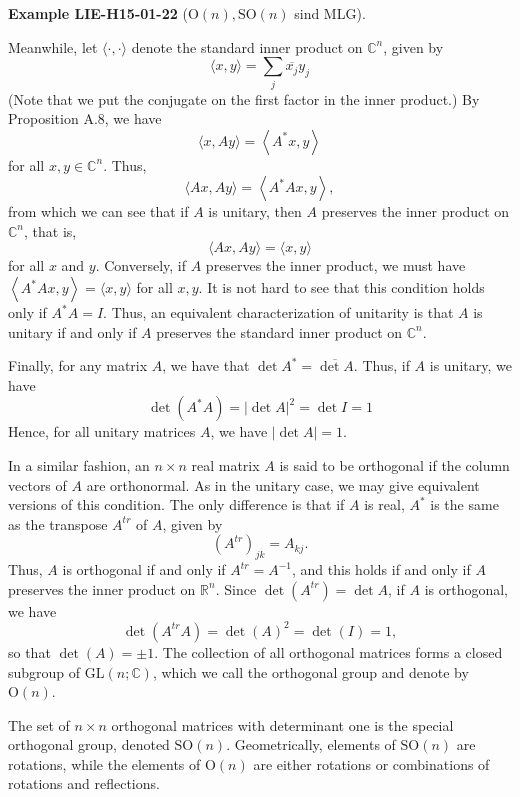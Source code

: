 \documentclass[10pt, letterpaper]{article}
\newcommand{\SO}{\mathrm{SO}}
\newcommand{\Ogroup}{\mathrm{O}} %
\newcommand{\CustomHeading}[3]{%
  \par\medskip\noindent%
  \textbf{#1 #2} \textnormal{(#3)}.\enskip%
}
\newenvironment{EXA}[2]{\CustomHeading{Example}{#1}{#2}}{}
\begin{document}
\begin{EXA}{LIE-H15-01-22}{$\Ogroup(n), \SO(n)$ sind MLG}
Meanwhile, let $\langle\cdot, \cdot\rangle$ denote the standard inner product on $\mathbb{C}^{n}$, given by
$$
\langle x, y\rangle=\sum_{j} \overline{x_{j}} y_{j}
$$
(Note that we put the conjugate on the first factor in the inner product.) By Proposition A.8, we have
$$
\langle x, A y\rangle=\left\langle A^{*} x, y\right\rangle
$$
for all $x, y \in \mathbb{C}^{n}$. Thus,
$$
\langle A x, A y\rangle=\left\langle A^{*} A x, y\right\rangle,
$$
from which we can see that if $A$ is unitary, then $A$ preserves the inner product on $\mathbb{C}^{n}$, that is,
$$
\langle A x, A y\rangle=\langle x, y\rangle
$$
for all $x$ and $y$. Conversely, if $A$ preserves the inner product, we must have $\left\langle A^{*} A x, y\right\rangle=\langle x, y\rangle$ for all $x, y$. It is not hard to see that this condition holds only if $A^{*} A=I$. Thus, an equivalent characterization of unitarity is that $A$ is unitary if and only if $A$ preserves the standard inner product on $\mathbb{C}^{n}$.

Finally, for any matrix $A$, we have that $\operatorname{det} A^{*}=\overline{\operatorname{det} A}$. Thus, if $A$ is unitary, we have
$$
\operatorname{det}\left(A^{*} A\right)=|\operatorname{det} A|^{2}=\operatorname{det} I=1
$$
Hence, for all unitary matrices $A$, we have $|\operatorname{det} A|=1$.

In a similar fashion, an $n \times n$ real matrix $A$ is said to be orthogonal if the column vectors of $A$ are orthonormal. As in the unitary case, we may give equivalent versions of this condition. The only difference is that if $A$ is real, $A^{*}$ is the same as the transpose $A^{t r}$ of $A$, given by
$$
\left(A^{t r}\right)_{j k}=A_{k j} .
$$
Thus, $A$ is orthogonal if and only if $A^{t r}=A^{-1}$, and this holds if and only if $A$ preserves the inner product on $\mathbb{R}^{n}$. Since $\operatorname{det}\left(A^{t r}\right)=\operatorname{det} A$, if $A$ is orthogonal, we have
$$
\operatorname{det}\left(A^{t r} A\right)=\operatorname{det}(A)^{2}=\operatorname{det}(I)=1,
$$
so that $\operatorname{det}(A)= \pm 1$. The collection of all orthogonal matrices forms a closed subgroup of $\mathrm{GL}(n ; \mathbb{C})$, which we call the orthogonal group and denote by $\mathrm{O}(n)$. 

The set of $n \times n$ orthogonal matrices with determinant one is the special orthogonal group, denoted $\mathrm{SO}(n)$. Geometrically, elements of $\mathrm{SO}(n)$ are rotations, while the elements of $\mathrm{O}(n)$ are either rotations or combinations of rotations and reflections.
\end{EXA}
\end{document}
